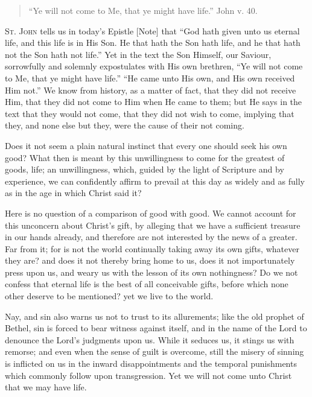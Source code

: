 
\begin{quote}

``Ye will not come to Me, that ye might have life.'' John
v. 40.

\end{quote}

S\textsc{t}. J\textsc{ohn} tells us in today's Epistle [Note]
that ``God hath given unto us eternal life, and this life is in
His Son. He that hath the Son hath life, and he that hath not the Son
hath not life.'' Yet in the text the Son Himself, our Saviour,
sorrowfully and solemnly expostulates with His own brethren, ``Ye
will not come to Me, that ye might have life.'' ``He came unto
His own, and His own received Him not.'' We know from history, as
a matter of fact, that they did not receive Him, that they did not
come to Him when He came to them; but He says in the text that they
would not come, that they did not wish to come, implying that they,
and none else but they, were the cause of their not coming.

Does it not seem a plain natural instinct that every one should
seek his own good? What then is meant by this unwillingness to come
for the greatest of goods, life; an unwillingness, which, guided by
the light of Scripture and by experience, we can confidently affirm to
prevail at this day as widely and as fully as in the age in which
Christ said it?

Here is no question of a comparison of good with good. We cannot
account for this unconcern about Christ's gift, by alleging that we
have a sufficient treasure in our hands already, and therefore are not
interested by the news of a greater. Far from it; for is not the world
continually taking away its own gifts, whatever they are? and does it
not thereby bring home to us, does it not importunately press upon us,
and weary us with the lesson of its own nothingness? Do we not confess
that eternal life is the best of all conceivable gifts, before which
none other deserve to be mentioned? yet we live to the world.

Nay, and sin also warns us not to trust to its allurements; like
the old prophet of Bethel, sin is forced to bear witness against
itself, and in the name of the Lord to denounce the Lord's judgments
upon us. While it seduces us, it stings us with remorse; and even when
the sense of guilt is overcome, still the misery of sinning is
inflicted on us in the inward disappointments and the temporal
punishments which commonly follow upon transgression. Yet we will not
come unto Christ that we may have life.

